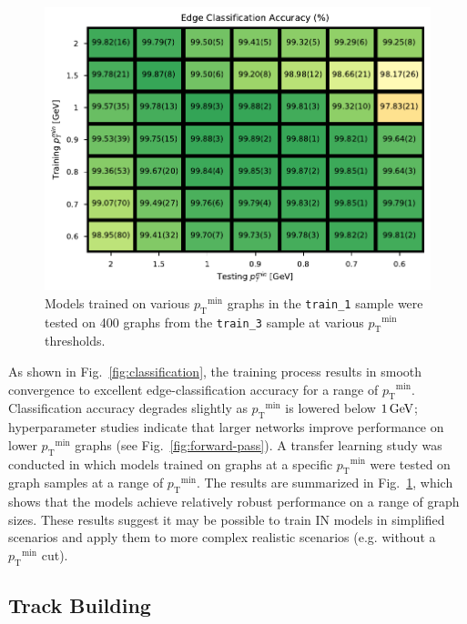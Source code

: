 \documentclass[twocolumn]{svjour3}
\newcommand{\pt}{\ensuremath{p_{\mathrm{T}}}\xspace}
\newcommand{\GeV}{\ensuremath{\,\text{Ge\hspace{-.08em}V}}\xspace}
\begin{document}
\begin{figure}[!htbp]
\centering
\includegraphics[width=\columnwidth,clip]{transfer_learning.pdf}
\caption{Models trained on various $\pt^\mathrm{min}$ graphs in the \texttt{train\_1} sample were tested on 400 graphs from the \texttt{train\_3} sample at various $\pt^\mathrm{min}$ thresholds. }
\label{fig:accuracy}
\end{figure}

As shown in Fig.~\ref{fig:classification}, the training process results in smooth convergence to excellent edge-classification accuracy for a range of $\pt^\mathrm{min}$. 
Classification accuracy degrades slightly as $\pt^\mathrm{min}$ is lowered below $1\GeV$; hyperparameter studies indicate that larger networks improve performance on lower $\pt^\mathrm{min}$ graphs (see Fig.~\ref{fig:forward-pass}). 
A transfer learning study was conducted in which models trained on graphs at a specific $\pt^\mathrm{min}$ were tested on graph samples at a range of $\pt^\mathrm{min}$. 
The results are summarized in Fig.~\ref{fig:accuracy}, which shows that the models achieve relatively robust performance on a range of graph sizes. 
These results suggest it may be possible to train IN models in simplified scenarios and apply them to more complex realistic scenarios (e.g. without a $\pt^\mathrm{min}$ cut). 


\subsection{Track Building}
\label{sec:trackbuilding}
\end{document}
